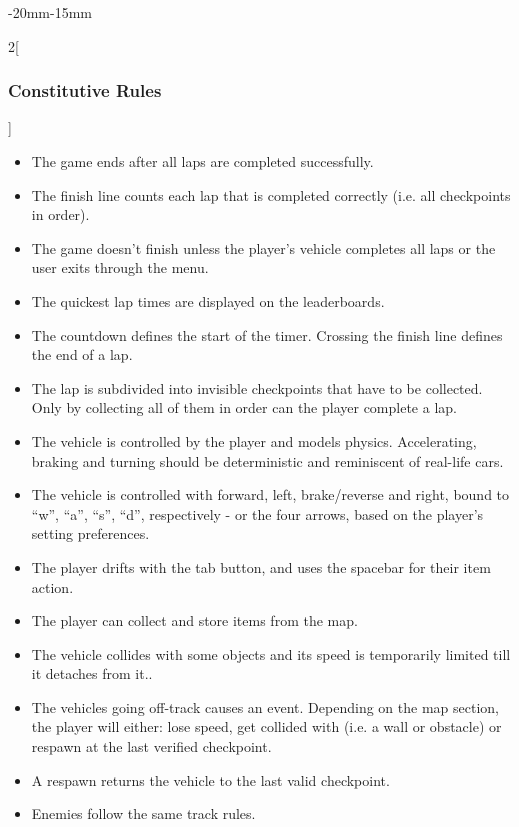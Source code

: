 \documentclass[12pt]{article}
\begin{document}
\begin{adjustwidth}{-20mm}{-15mm}
\begin{multicols}{2}[\subsubsection{Constitutive Rules}]
\raggedcolumns
\begin{itemize}
\item The game ends after all laps are completed successfully.
\item The finish line counts each lap that is completed correctly (i.e. all checkpoints in order).
\item The game doesn’t finish unless the player’s vehicle completes all laps or the user exits through the menu.
\item The quickest lap times are displayed on the leaderboards.
\item The countdown defines the start of the timer. Crossing the finish line defines the end of a lap.
\item The lap is subdivided into invisible checkpoints that have to be collected. Only by collecting all of them in order can the player complete a lap.
\item The vehicle is controlled by the player and models physics. Accelerating, braking and turning should be deterministic and reminiscent of real-life cars.
\item The vehicle is controlled with forward, left, brake/reverse and right, bound to ``w'', ``a'', ``s'', ``d'', respectively - or the four arrows, based on the player’s setting preferences.
\item The player drifts with the tab button, and uses the spacebar for their item action.
\item The player can collect and store items from the map.
\item The vehicle collides with some objects and its speed is temporarily limited till it detaches from it..
\item The vehicles going off-track causes an event. Depending on the map section, the player will either: lose speed, get collided with (i.e. a wall or obstacle) or respawn at the last verified checkpoint.
\item A respawn returns the vehicle to the last valid checkpoint.
\item Enemies follow the same track rules.
\end{itemize}
\end{multicols}
\end{adjustwidth}
\end{document}
